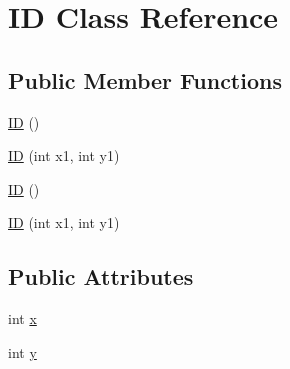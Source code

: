 \hypertarget{class_i_d}{\section{I\+D Class Reference}
\label{class_i_d}
}
\subsection*{Public Member Functions}
\begin{DoxyCompactItemize}
\item 
\hyperlink{class_i_d_aa2e4cc0b4fe139ee001bee463916b2d3}{I\+D} ()
\item 
\hyperlink{class_i_d_a7b6510cfeeceebd89cb2868c4c7b3abd}{I\+D} (int x1, int y1)
\item 
\hyperlink{class_i_d_aa2e4cc0b4fe139ee001bee463916b2d3}{I\+D} ()
\item 
\hyperlink{class_i_d_a7b6510cfeeceebd89cb2868c4c7b3abd}{I\+D} (int x1, int y1)
\end{DoxyCompactItemize}
\subsection*{Public Attributes}
\begin{DoxyCompactItemize}
\item 
int \hyperlink{class_i_d_a6525f6aac513b6c98d253979b4a09509}{x}
\item 
int \hyperlink{class_i_d_a9dece9c4db67b1f7ff84ff9c50aaff34}{y}
\end{DoxyCompactItemize}


